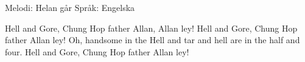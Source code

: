 \begin{song}

\begin{songmeta}
Melodi: Helan går
Språk: Engelska
\end{songmeta}

\begin{songtext}
Hell and Gore,
Chung Hop father Allan, Allan ley!
Hell and Gore,
Chung Hop father Allan ley!
Oh, handsome in the Hell and tar
and hell are in the half and four.
Hell and Gore,
Chung Hop father Allan ley!
\end{songtext}
\end{song}
